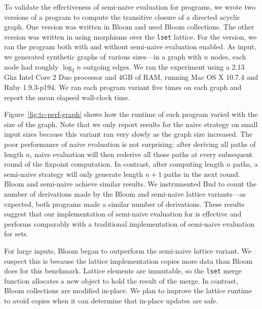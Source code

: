 To validate the effectiveness of semi-naive evaluation for \lang programs, we
wrote two versions of a program to compute the transitive closure of a directed
acyclic graph. One version was written in Bloom and used Bloom collections. The
other version was written in \lang using morphisms over the \texttt{lset}
lattice. For the \lang version, we ran the program both with and without
semi-naive evaluation enabled. As input, we generated synthetic graphs of
various sizes---in a graph with $n$ nodes, each node had roughly $\log_2 n$ outgoing
edges. We ran the experiment using a 2.13 Ghz Intel Core 2 Duo processor and 4GB
of RAM, running Mac OS X 10.7.4 and Ruby 1.9.3-p194. We ran each program variant
five times on each graph and report the mean elapsed wall-clock time.

Figure~\ref{fig:tc-perf-graph} shows how the runtime of each program varied with
the size of the graph. Note that we only report results for the naive \lang
strategy on small input sizes because this variant ran very slowly as the graph
size increased. The poor performance of naive evaluation is not surprising:
after deriving all paths of length $n$, naive evaluation will then rederive all
those paths at every subsequent round of the fixpoint computation. In contrast,
after computing length $n$ paths, a semi-naive strategy will only generate
length $n+1$ paths in the next round. Bloom and semi-naive \lang achieve similar
results. We instrumented Bud to count the number of derivations made by the
Bloom and semi-naive lattice variants---as expected, both programs made a
similar number of derivations. These results suggest that our implementation of
semi-naive evaluation for \lang is effective and performs comparably with
a traditional implementation of semi-naive evaluation for sets.

For large inputs, Bloom began to outperform the semi-naive lattice variant. We
suspect this is because the lattice implementation copies more data than Bloom
does for this benchmark. Lattice elements are immutable, so the \texttt{lset}
merge function allocates a new object to hold the result of the merge. In
contrast, Bloom collections are modified in-place. We plan to improve the
lattice runtime to avoid copies when it can determine that in-place updates are
safe.

